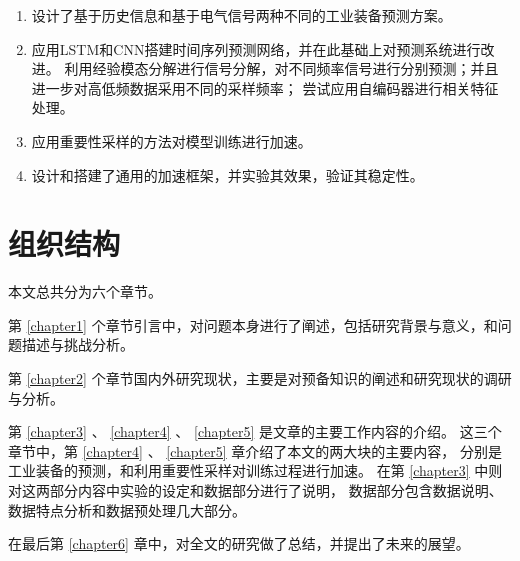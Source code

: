 \begin{enumerate}
  \item 设计了基于历史信息和基于电气信号两种不同的工业装备预测方案。
  \item 应用LSTM和CNN搭建时间序列预测网络，并在此基础上对预测系统进行改进。
  利用经验模态分解进行信号分解，对不同频率信号进行分别预测；并且进一步对高低频数据采用不同的采样频率；
  尝试应用自编码器进行相关特征处理。
  \item 应用重要性采样的方法对模型训练进行加速。
  \item 设计和搭建了通用的加速框架，并实验其效果，验证其稳定性。
\end{enumerate}

\section{组织结构}
本文总共分为六个章节。

第 \ref{chapter1} 个章节引言中，对问题本身进行了阐述，包括研究背景与意义，和问题描述与挑战分析。

第 \ref{chapter2} 个章节国内外研究现状，主要是对预备知识的阐述和研究现状的调研与分析。

第 \ref{chapter3} 、 \ref{chapter4} 、 \ref{chapter5} 是文章的主要工作内容的介绍。
这三个章节中，第 \ref{chapter4} 、 \ref{chapter5} 章介绍了本文的两大块的主要内容，
分别是工业装备的预测，和利用重要性采样对训练过程进行加速。
在第 \ref{chapter3} 中则对这两部分内容中实验的设定和数据部分进行了说明，
数据部分包含数据说明、数据特点分析和数据预处理几大部分。

在最后第  \ref{chapter6} 章中，对全文的研究做了总结，并提出了未来的展望。